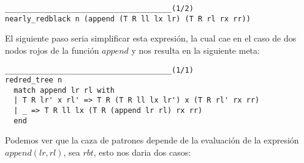 \begin{verbatim}
______________________________________(1/2)
nearly_redblack n (append (T R ll lx lr) (T R rl rx rr))
\end{verbatim}

El siguiente paso seria simplificar esta expresión, la cual cae en el caso de dos nodos rojos de la función $append$ y nos resulta en la siguiente meta:

\begin{verbatim}
______________________________________(1/1)
redred_tree n
  match append lr rl with
  | T R lr' x rl' => T R (T R ll lx lr') x (T R rl' rx rr)
  | _ => T R ll lx (T R (append lr rl) rx rr)
  end
\end{verbatim}

Podemos ver que la caza de patrones depende de la evaluaci\'on de la expresi\'on $append(lr,rl)$,
sea $rbt$, esto nos daria dos casos:

